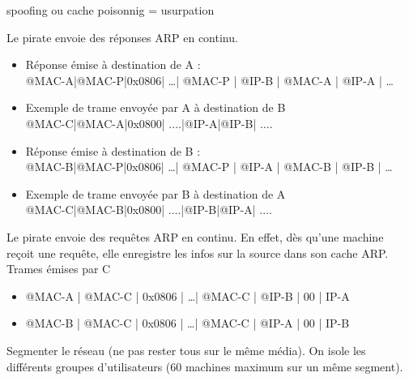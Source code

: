  spoofing ou cache poisonnig = usurpation

 Le pirate envoie des réponses ARP en continu.
\begin{itemize}
 \item Réponse émise à destination de A : \\
	@MAC-A|@MAC-P|0x0806| \ldots | @MAC-P | @IP-B | @MAC-A | @IP-A | \ldots
 \item Exemple de trame envoyée par A à destination de B \\
	@MAC-C|@MAC-A|0x0800| ....|@IP-A|@IP-B| .... 
 \item Réponse émise à destination de B : \\
	@MAC-B|@MAC-P|0x0806| \ldots | @MAC-P | @IP-A | @MAC-B | @IP-B | \ldots
 \item Exemple de trame envoyée par B à destination de A \\
	@MAC-C|@MAC-B|0x0800| ....|@IP-B|@IP-A| .... 
\end{itemize}

 Le pirate envoie des requêtes ARP en continu. En effet, dès qu'une machine reçoit une requête, elle enregistre les infos sur la source dans son cache ARP. \\
	Trames émises par C 
	\begin{itemize}
		\item @MAC-A | @MAC-C | 0x0806 | \ldots | @MAC-C | @IP-B | 00 | IP-A
		\item @MAC-B | @MAC-C | 0x0806 | \ldots | @MAC-C | @IP-A | 00 | IP-B
	\end{itemize}

 Segmenter le réseau (ne pas rester tous sur le même média). On isole les différents groupes d'utilisateurs (60 machines maximum sur un même segment).

